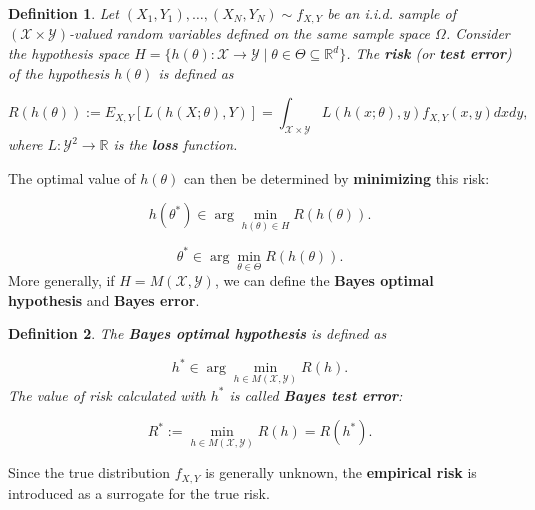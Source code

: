 \documentclass{report}
\newtheorem{definition}{Definition}[chapter]
\begin{document}
\begin{definition}
Let $(X_1, Y_1),\dots,(X_N, Y_N) \sim f_{X,Y}$ be an i.i.d. sample of $(\mathcal{X} \times \mathcal{Y})$-valued random variables defined on the same sample space $\Omega$. Consider the hypothesis space $H = \{h(\theta) : \mathcal{X} \to \mathcal{Y} \mid\theta\in\Theta\subseteq\mathbb{R}^d\}$. The \textbf{risk} (or \textbf{test error}) of the hypothesis $h(\theta)$ is defined as

\begin{equation}
R(h(\theta)) := E_{X,Y}[L(h(X;\theta),Y)] = \int_{\mathcal{X} \times \mathcal{Y}} L(h(x;\theta),y)f_{X,Y}(x,y)dxdy,
\end{equation}
where $L :\mathcal{Y}^2 \to \mathbb{R}$ is the \textbf{loss} function.
\end{definition}
The optimal value of $h(\theta)$ can then be determined by \textbf{minimizing} this risk:

\begin{equation}
h(\theta^*) \in \arg \min_{h(\theta) \in H} R(h(\theta)).
\end{equation}

\begin{equation}
\theta^* \in \arg \min_{\theta \in \Theta} R(h(\theta)).
\end{equation}
More generally, if $H = M(\mathcal{X}, \mathcal{Y})$, we can define the \textbf{Bayes optimal hypothesis} and \textbf{Bayes error}.

\begin{definition}
The \textbf{Bayes optimal hypothesis} is defined as

\begin{equation}
h^*\in \arg \min_{h \in M(\mathcal{X}, \mathcal{Y})} R(h).
\end{equation}
The value of risk calculated with $h^*$ is called \textbf{Bayes test error}:

\begin{equation}
R^* := \min_{h \in M(\mathcal{X}, \mathcal{Y})} R(h) = R(h^*).
\end{equation}
\end{definition}
Since the true distribution $f_{X,Y}$ is generally unknown, the \textbf{empirical risk} is introduced as a surrogate for the true risk.
\end{document}
